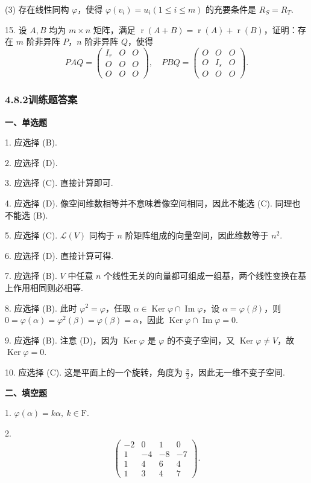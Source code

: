 \documentclass[UTF8, 12pt, fontset=fandol, oneside]{ctexart}
\begin{document}
(3) 存在线性同构 $\varphi$，使得 $\varphi(v_i)=u_i(1\le i\le m)$ 的充要条件是 $R_S=R_T$.

15. 设 $A,B$ 均为 $m\times n$ 矩阵，满足 $\operatorname{r}(A+B)=\operatorname{r}(A)+\operatorname{r}(B)$，证明：存在 $m$ 阶非异阵 $P$，$n$ 阶非异阵 $Q$，使得
\[
PAQ=\left(\begin{array}{ccc}
I_r & O & O\\
O & O & O\\
O & O & O
\end{array}\right),\quad
PBQ=\left(\begin{array}{ccc}
O & O & O\\
O & I_s & O\\
O & O & O
\end{array}\right).
\]

\subsubsection*{4.8.2\quad 训练题答案}

\noindent\textbf{一、单选题}

1. 应选择 (B).

2. 应选择 (D).

3. 应选择 (C). 直接计算即可.

4. 应选择 (D). 像空间维数相等并不意味着像空间相同，因此不能选 (C). 同理也不能选 (B).

5. 应选择 (C). $\mathcal{L}(V)$ 同构于 $n$ 阶矩阵组成的向量空间，因此维数等于 $n^2$.

6. 应选择 (D). 直接计算可得.

7. 应选择 (B). $V$ 中任意 $n$ 个线性无关的向量都可组成一组基，两个线性变换在基上作用相同则必相等.

8. 应选择 (B). 此时 $\varphi^2=\varphi$，任取 $\alpha\in\operatorname{Ker}\varphi\cap\operatorname{Im}\varphi$，设 $\alpha=\varphi(\beta)$，则 $0=\varphi(\alpha)=\varphi^2(\beta)=\varphi(\beta)=\alpha$，因此 $\operatorname{Ker}\varphi\cap\operatorname{Im}\varphi=0$.

9. 应选择 (B). 注意 (D)，因为 $\operatorname{Ker}\varphi$ 是 $\varphi$ 的不变子空间，又 $\operatorname{Ker}\varphi\ne V$，故 $\operatorname{Ker}\varphi=0$.

10. 应选择 (C). 这是平面上的一个旋转，角度为 $\frac{\pi}{2}$，因此无一维不变子空间.

\noindent\textbf{二、填空题}

1. $\varphi(\alpha)=k\alpha,\ k\in\mathrm{F}$.

2.
\[
\left(\begin{array}{rrrr}
-2 & 0 & 1 & 0\\
1 & -4 & -8 & -7\\
1 & 4 & 6 & 4\\
1 & 3 & 4 & 7
\end{array}\right).
\]
\end{document}
